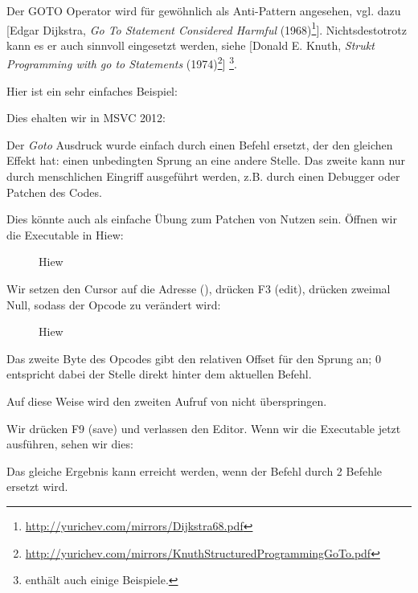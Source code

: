 
Der GOTO Operator wird für gewöhnlich als Anti-Pattern angesehen, vgl. dazu
[Edgar Dijkstra, \emph{Go To Statement Considered Harmful} (1968)\footnote{\url{http://yurichev.com/mirrors/Dijkstra68.pdf}}].
Nichtsdestotrotz kann es er auch sinnvoll eingesetzt werden, siehe
[Donald E. Knuth, \emph{Strukt Programming with go to Statements} (1974)\footnote{\url{http://yurichev.com/mirrors/KnuthStructuredProgrammingGoTo.pdf}}]
\footnote{\InSqBrackets{\CNotes} enthält auch einige Beispiele.}.

Hier ist ein sehr einfaches Beispiel:



Dies ehalten wir in MSVC 2012:


Der \emph{Goto} Ausdruck wurde einfach durch einen \JMP Befehl ersetzt, der den gleichen Effekt hat: einen unbedingten Sprung an eine andere Stelle.
Das zweite \printf kann nur durch menschlichen Eingriff ausgeführt werden, z.B. durch einen Debugger oder Patchen des Codes.

\par

\clearpage
Dies könnte auch als einfache Übung zum Patchen von Nutzen sein. Öffnen wir die Executable in Hiew:

\begin{figure}[H]
\centering
{}
\caption{Hiew}
\label{fig:goto_hiew1}
\end{figure}

\clearpage
Wir setzen den Cursor auf die Adresse \JMP (), drücken F3 (edit), drücken zweimal Null, sodass der Opcode
zu  verändert wird:

\begin{figure}[H]
\centering
{}
\caption{Hiew}
\label{fig:goto_hiew2}
\end{figure}
Das zweite Byte des \JMP Opcodes gibt den relativen Offset für den Sprung an; 0 entspricht dabei der Stelle direkt
hinter dem aktuellen Befehl.

Auf diese Weise wird \JMP den zweiten Aufruf von \printf nicht überspringen.

Wir drücken F9 (save) und verlassen den Editor. Wenn wir die Executable jetzt ausführen, sehen wir dies:


Das gleiche Ergebnis kann erreicht werden, wenn der \JMP Befehl durch 2 \NOP Befehle ersetzt wird.

